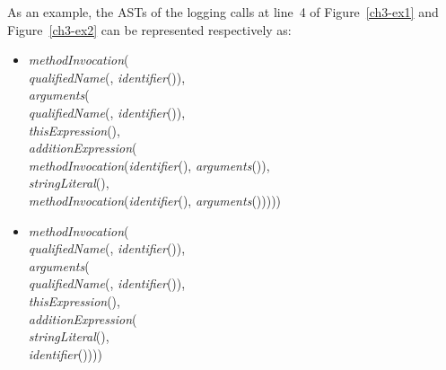 As an example, the ASTs of the logging calls at line~4 of Figure~\ref{ch3-ex1} and Figure~\ref{ch3-ex2} can be represented respectively as:
\begin{itemize} [leftmargin=0.7in]
\item \textit{methodInvocation}(\\
\hspace*{1em}\textit{qualifiedName}(, \textit{identifier}()),\\
\hspace*{1em}\textit{arguments}(\\
\hspace*{2em}\textit{qualifiedName}(, \mbox{\textit{identifier}()}),\\
\hspace*{2em}\textit{thisExpression}(),\\
\hspace*{2em}\textit{additionExpression}(\\
\hspace*{3em}\textit{methodInvocation}(\textit{identifier}(), \textit{arguments}()),\\
\hspace*{3em}\textit{stringLiteral}(),\\
\hspace*{3em}\textit{methodInvocation}(\textit{identifier}(), \textit{arguments}()))))
\item \textit{methodInvocation}(\\
\hspace*{1em}\textit{qualifiedName}(, \textit{identifier}()),\\
\hspace*{1em}\textit{arguments}(\\
\hspace*{2em}\textit{qualifiedName}(, \mbox{\textit{identifier}()}),\\
\hspace*{2em}\textit{thisExpression}(),\\
\hspace*{2em}\textit{additionExpression}(\\
\hspace*{3em}\textit{stringLiteral}(),\\
\hspace*{3em}\textit{identifier}())))
\end{itemize}

